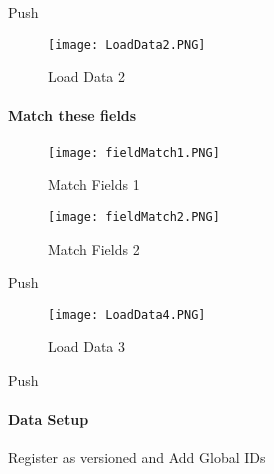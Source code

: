 {\bigbtn Push }
 \begin{figure}[h!]
 \centering
     \texttt{[image: LoadData2.PNG]}
 \caption{Load Data 2}
 \end{figure}
 \clearpage
 \paragraph[Match these fields]{\Large Match these fields}

 \begin{figure}[h!]
 \centering
     \texttt{[image: fieldMatch1.PNG]}
 \vspace{-.2in}

 \caption{Match Fields 1}
 \end{figure}
 \begin{figure}[h!]
 \centering
     \texttt{[image: fieldMatch2.PNG]}
 \vspace{-.2in}

 \caption{Match Fields 2}
 \end{figure}
 \clearpage
{\bigbtn Push }
 \begin{figure}[h!]
 \centering
     \texttt{[image: LoadData4.PNG]}
 \caption{Load Data 3}
 \end{figure}

{\bigbtn Push }
 \clearpage
 \paragraph{Data Setup}
 \vspace{.2in}

 Register as versioned and Add Global IDs
 \vspace{.2in}

